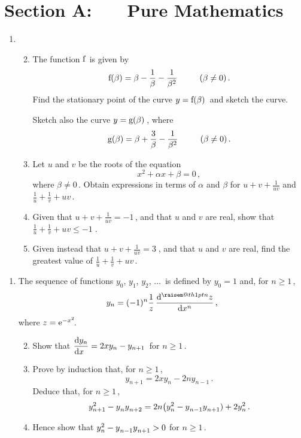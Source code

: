 \documentclass[a4, 11pt]{report}
\makeatletter
\newlength{\qspace}
\newcounter{qnumber}
\newenvironment{question}%
 {\vspace{\qspace}
  \begin{enumerate}[\bfseries 1\quad][10]%
    \setcounter{enumi}{\value{qnumber}}%
    \item%
 }
{
  \end{enumerate}
  \filbreak
  \stepcounter{qnumber}
 }
\newenvironment{questionparts}[1][1]%
 {
  \begin{enumerate}[\bfseries (i)]%
    \setcounter{enumii}{#1}
    \addtocounter{enumii}{-1}
    \setlength{\itemsep}{3mm}
    \setlength{\parskip}{8pt}
 }
 {
  \end{enumerate}
 }
\def\d{{\rm d}}
\def\e{{\rm e}}
\def\g{{\rm g}}
\def\f{{\rm f}}
\newcommand{\raisemath}[1]{\mathpalette{\raisem@th{#1}}}
\newcommand{\raisem@th}[3]{\raisebox{#1}{$#2#3$}}
\def\le{\leqslant}
\def\ge{\geqslant}
\makeatother
\begin{document}
\setcounter{page}{2}


 
\section*{Section A: \ \ \ Pure Mathematics}


\begin{question}
\begin{questionparts}
\item 
The function $\f$  is given by
\[
\f(\beta)=\beta - \frac 1 \beta - \frac 1 {\beta^2}
\ \ \ \ \ \ \ \ (\beta\ne0) \,.
\]
Find the stationary point of 
the curve $y=\f(\beta)\,$ and sketch the curve.


Sketch also the curve $y=\g(\beta)\,$, where 
\[
\g(\beta) = \beta + \frac 3 \beta - \frac 1 {\beta^2}
\ \ \ \ \ \ \ \ (\beta\ne0)\,.
\]
\item
Let $u$ and $v$ be the roots of the equation
\[
x^2 +\alpha x +\beta = 0
\,,
\]
where $\beta\ne0\,$.
Obtain expressions in terms of $\alpha$ and $\beta$ for 
$\displaystyle u+v + \frac 1 {uv}$ and  
$ \displaystyle \frac 1 u + \frac 1 v + uv\,$.

\item  Given that 
$\displaystyle u+v + \frac 1 {uv} = -1\,$,   
and that 
$u$ and $v$ are real, 
show  that  $\displaystyle \frac 1 u+ \frac 1 v +  {uv} \le -1\;$.  


\item Given  instead that  
$\displaystyle u+v + \frac 1 {uv} = 3 \;$, and that $u$ and $v$ are real,
find the greatest value of   
$\displaystyle  \frac 1 u+ \frac 1v +  {uv}\,$. 


\end{questionparts}


\end{question}

\begin{question}
The sequence of functions 
$y_0$, $y_1$, $y_2$, $\ldots\,$ is defined by $y_0=1$ and, for $n\ge1\,$,
\[
 y_n = (-1)^n \frac {1}{z} \, \frac{\d^{\raisemath{1pt}{n}} z}{\d x^n}
\,,
\] 
where $z= \e^{-x^2}\!$.

\begin{questionparts}
\item Show that 
$\dfrac{\d y_n}{\hspace{-4.7pt}\d x} = 2x y_n -y_{n+1}\,$ for $n\ge1\,$.
\item Prove by induction that, for $n\ge1\,$,
\[
y_{n+1}  = 2x y_n  -2ny_{n-1}
\,.
\]
Deduce that, for $n\ge1\,$, 
\[
y_{n+1}^2  - {y\vphantom{^2}}_n {y\vphantom{^n}}_{n+2}   
= 2n
\big( y_n^2 - {y\vphantom{^n}}_{n-1}{y\vphantom{^2}}_{n+1}) 
+ 2 y_n^2
\,.
\]
\item Hence show that $y_{n}^2 
- {y\vphantom{^2}}_{n-1} {y\vphantom{^2}}_{n+1} >0$ for $n\ge1\,$.
\end{questionparts}
\end{question}
\end{document}
